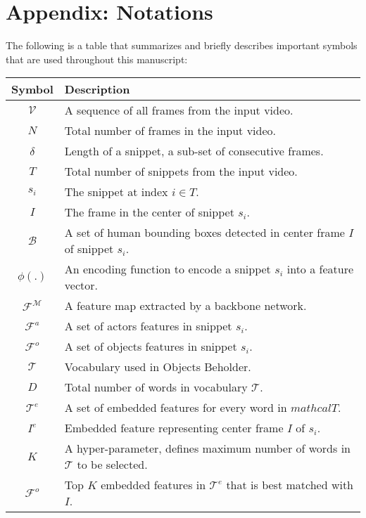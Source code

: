 \documentclass[sn-mathphys]{sn-jnl}
\theoremstyle{thmstyleone}\newtheorem{theorem}{Theorem}\newtheorem{proposition}[theorem]{Proposition}
\theoremstyle{thmstyletwo}\newtheorem{example}{Example}\newtheorem{remark}{Remark}
\theoremstyle{thmstylethree}\newtheorem{definition}{Definition}
\begin{document}
\section*{Appendix: Notations}
The following is a table that summarizes and briefly describes important symbols that are used throughout this manuscript:
\begin{table}[!ht]
\begin{tabular}{c|l}
        Symbol & Description \\ \hline
        $\mathcal{V}$ & A sequence of all frames from the input video.\\ \hline
        $N$ & Total number of frames in the input video.\\ \hline
        $\delta$ & Length of a snippet, a sub-set of consecutive frames. \\ \hline
        $T$ & Total number of snippets from the input video.\\ \hline
        $s_i$ & The snippet at index $i\in T$.\\ \hline
        $I$ & The frame in the center of snippet $s_i$.\\ \hline
        $\mathcal{B}$ & A set of human bounding boxes detected in center frame $I$ of snippet $s_i$.\\ \hline
        $\phi(.)$ & An encoding function to encode a snippet $s_i$ into a feature vector.\\ \hline
        $\mathcal{F}^\mathcal{M}$ & A feature map extracted by a backbone network.\\ \hline
        $\mathcal{F}^a$ & A set of actors features in snippet $s_i$.\\ \hline
        $\mathcal{F}^o$ & A set of objects features in snippet $s_i$.\\ \hline
        $\mathcal{T}$ & Vocabulary used in Objects Beholder.\\ \hline
        $D$ & Total number of words in vocabulary $\mathcal{T}$.\\ \hline
        $\mathcal{T}^e$ & A set of embedded features for every word in $mathcal{T}$.\\ \hline
        $I^e$ & Embedded feature representing center frame $I$ of $s_i$.\\ \hline
        $K$ & A hyper-parameter, defines maximum number of words in $\mathcal{T}$ to be selected.\\ \hline
        $\mathcal{F}^o$ & Top $K$ embedded features in $\mathcal{T}^e$ that is best matched with $I$.\\ \hline

\end{tabular}
\end{table}
\end{document}
